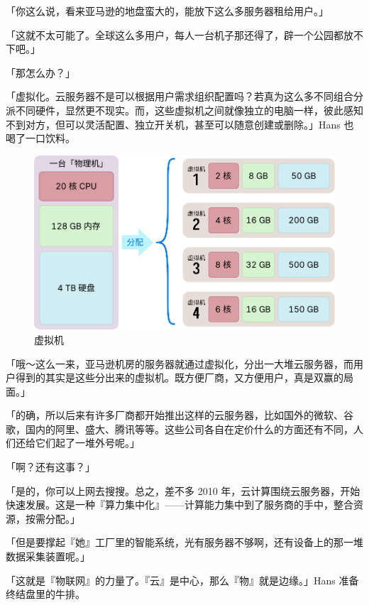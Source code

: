 「你这么说，看来亚马逊的地盘蛮大的，能放下这么多服务器租给用户。」

「这就不太可能了。全球这么多用户，每人一台机子那还得了，辟一个公园都放不下吧。」

「那怎么办？」

「虚拟化。云服务器不是可以根据用户需求组织配置吗？若真为这么多不同组合分派不同硬件，显然更不现实。而，这些虚拟机之间就像独立的电脑一样，彼此感知不到对方，但可以灵活配置、独立开关机，甚至可以随意创建或删除。」Hans 也喝了一口饮料。

\begin{figure}[htb!]
  \centering
  \includegraphics[width=.7\textwidth]{assets/surpass/VMs.pdf}
  \caption{虚拟机}
  \label{fig:VMs}
\end{figure}

「哦～这么一来，亚马逊机房的服务器就通过虚拟化，分出一大堆云服务器，而用户得到的其实是这些分出来的虚拟机。既方便厂商，又方便用户，真是双赢的局面。」

「的确，所以后来有许多厂商都开始推出这样的云服务器，比如国外的微软、谷歌，国内的阿里、盛大、腾讯等等。这些公司各自在定价什么的方面还有不同，人们还给它们起了一堆外号呢。」

「啊？还有这事？」

「是的，你可以上网去搜搜。总之，差不多 2010 年，云计算围绕云服务器，开始快速发展。这是一种『算力集中化』——计算能力集中到了服务商的手中，整合资源，按需分配。」

「但是要撑起『她』工厂里的智能系统，光有服务器不够啊，还有设备上的那一堆数据采集装置呢。」

「这就是『物联网』的力量了。『云』是中心，那么『物』就是边缘。」Hans 准备终结盘里的牛排。

